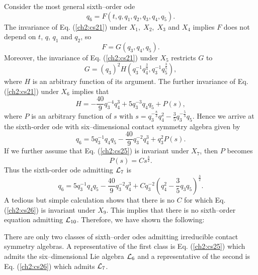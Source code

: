 Consider the most general sixth--order ode
\begin{equation}
q_6=F(t,q,q_1,q_2,q_3,q_4,q_5).
\label{ch2:cs21}
\end{equation}
The invariance of Eq. (\ref{ch2:cs21}) under $X_1,\; X_2,\; X_3$ and $X_4$
implies $F$ does not depend on $t$, $q$, $q_1$ and $q_2$, so 
\begin{equation}
F=G(q_3,q_4,q_5).
\label{ch2:cs22}
\end{equation}
Moreover, the invariance of Eq. (\ref{ch2:cs21}) under $X_5$ restricts
$G$ to
\begin{equation}
G=(q_3)^{2}H \left (q_3^{-1}q_4^{\frac{3}{4}},q_3^{-1}q_5^{\frac{3}{5}}
\right ),
\label{ch2:cs23}
\end{equation}
where $H$ is an arbitrary function of its argument.
The further invariance of Eq. (\ref{ch2:cs21}) under $X_6$ implies
that 
\begin{equation}
\label{ch2:cs24}
H=-\frac{40}{9}q_3^{-4}q_4^3+5q_3^{-3}q_4q_5+P(s),
\end{equation}
where $P$ is an arbitrary function of $s$ with
$s=q_3^{-\frac{8}{3}}q_4^2-\frac{3}{5}q_3^{-\frac{5}{3}}q_5$.
Hence we arrive at the sixth-order ode with six--dimensional
contact symmetry algebra given by
\begin{equation}
q_6=5q_3^{-1}q_4q_5-\frac{40}{9}q_3^{-2}q_4^3+q_3^2P(s).
\label{ch2:cs25}
\end{equation}
If we further assume that Eq. (\ref{ch2:cs25}) is invariant under
$X_7$, then $P$  becomes
\[P(s)=Cs^{\frac{3}{2}}.\]
Thus the sixth-order ode admitting ${\cal L}_7$ is
\begin{equation}
q_6=5q_3^{-1}q_4q_5-\frac{40}{9}q_3^{-2}q_4^3
+Cq_3^{-2} \left (q_4^2-\frac{3}{5}q_3q_5 \right )^{\frac{3}{2}}.
\label{ch2:cs26}
\end{equation}
A tedious but  simple calculation shows that there is no $C$ for which
Eq. (\ref{ch2:cs26}) is invariant
under $X_9$. This implies that there is no sixth--order equation
admitting ${\cal L}_{10}$. Therefore, we have shown the following:
\begin{theo}
\label{ch2:6cont}
\begin{em}
There are only two classes of sixth--order odes admitting irreducible contact
symmetry algebras. A representative of the first class is Eq. (\ref{ch2:cs25})
which
admits the six--dimensional Lie algebra ${\cal L}_6$ and a representative of the
second is Eq. (\ref{ch2:cs26}) which admits ${\cal L}_7$.
\end{em}
\end{theo}
